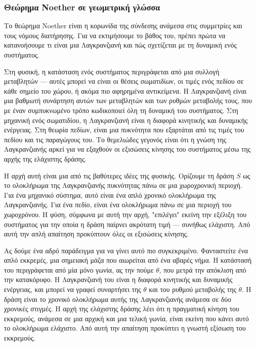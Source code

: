 \documentclass[12pt]{article}
\begin{document}
\subsubsection{Θεώρημα Noether σε γεωμετρική γλώσσα}

Το θεώρημα Noether είναι η κορωνίδα της σύνδεσης ανάμεσα στις συμμετρίες και τους νόμους διατήρησης. Για να εκτιμήσουμε το βάθος του, πρέπει πρώτα να κατανοήσουμε τι είναι μια Λαγκρανζιανή και πώς σχετίζεται με τη δυναμική ενός συστήματος.

Στη φυσική, η κατάσταση ενός συστήματος περιγράφεται από μια συλλογή μεταβλητών --- αυτές μπορεί να είναι οι θέσεις σωματιδίων, οι τιμές ενός πεδίου σε κάθε σημείο του χώρου, ή ακόμα πιο αφηρημένα αντικείμενα. Η Λαγκρανζιανή είναι μια βαθμωτή συνάρτηση αυτών των μεταβλητών και των ρυθμών μεταβολής τους, που με έναν συμπυκνωμένο τρόπο κωδικοποιεί όλη τη δυναμική του συστήματος. Στη μηχανική ενός σωματιδίου, η Λαγκρανζιανή είναι η διαφορά κινητικής και δυναμικής ενέργειας. Στη θεωρία πεδίων, είναι μια πυκνότητα που εξαρτάται από τις τιμές του πεδίου και τις παραγώγους του. Το θεμελιώδες γεγονός είναι ότι η γνώση της Λαγκρανζιανής αρκεί για να εξαχθούν οι εξισώσεις κίνησης του συστήματος μέσω της αρχής της ελάχιστης δράσης.

Η αρχή αυτή είναι μια από τις βαθύτερες ιδέες της φυσικής. Ορίζουμε τη δράση $S$ ως το ολοκλήρωμα της Λαγκρανζιανής πυκνότητας πάνω σε μια χωροχρονική περιοχή. Για ένα μηχανικό σύστημα, αυτό είναι ένα απλό χρονικό ολοκλήρωμα της Λαγκρανζιανής. Για ένα πεδίο, είναι ένα ολοκλήρωμα πάνω σε μια περιοχή του χωροχρόνου. Η φύση, σύμφωνα με αυτή την αρχή, "επιλέγει" εκείνη την εξέλιξη του συστήματος για την οποία η δράση παίρνει ακρότατη τιμή --- συνήθως ελάχιστη. Από αυτή την απλή απαίτηση προκύπτουν όλες οι εξισώσεις κίνησης.

Ας δούμε ένα αδρό παράδειγμα για να γίνει αυτό πιο συγκεκριμένο. Φανταστείτε ένα απλό εκκρεμές, μια σημειακή μάζα που αιωρείται από ένα αβαρές νήμα. Η κατάστασή του περιγράφεται από μία μόνο γωνία, ας την πούμε $\theta$, που μετρά την απόκλιση από την κατακόρυφο. Η Λαγκρανζιανή του είναι η διαφορά κινητικής και δυναμικής ενέργειας, και μπορεί να γραφεί συναρτήσει της $\theta$ και του ρυθμού μεταβολής της $\dot{\theta}$. Η δράση είναι το χρονικό ολοκλήρωμα αυτής της Λαγκρανζιανής ανάμεσα σε δύο χρονικές στιγμές. Η αρχή της ελάχιστης δράσης λέει ότι η πραγματική κίνηση του εκκρεμούς, ανάμεσα σε μια αρχική και μια τελική γωνία, είναι εκείνη που κάνει αυτό το ολοκλήρωμα ελάχιστο. Από αυτή την απαίτηση προκύπτει η γνωστή εξίσωση του εκκρεμούς.
\end{document}
